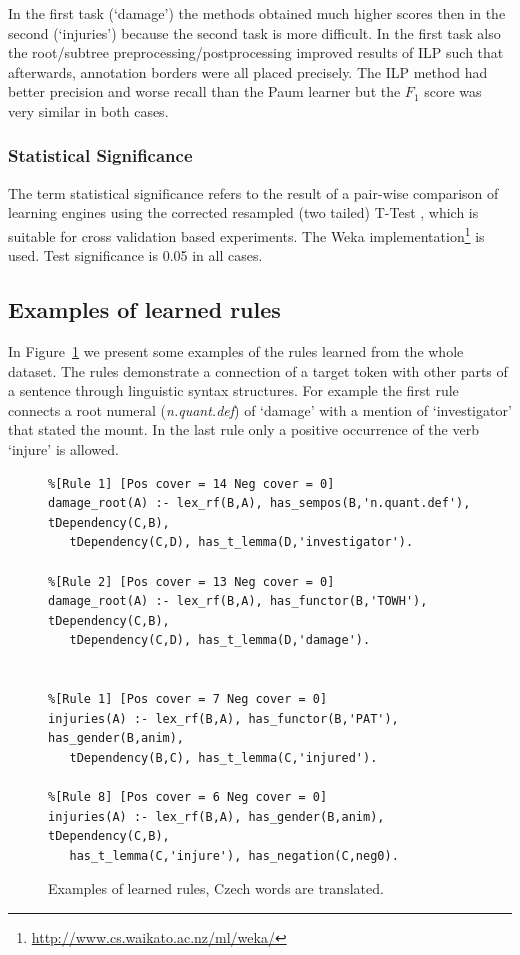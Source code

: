 In the first task (`damage') the methods obtained much higher scores then in the second (`injuries') because the second task is more difficult. In the first task also the root/subtree preprocessing/postprocessing improved results of ILP such that afterwards, annotation borders were all placed precisely. The ILP method had better precision and worse recall than the Paum learner but the $F_1$ score was very similar in both cases.

\subsubsection{Statistical Significance}
The term statistical significance refers to the result of a pair-wise comparison of learning engines using the corrected resampled (two tailed) T-Test \citep{Nadeau:2003:IGE:779909.779927}, which is suitable for cross validation based experiments. The Weka implementation\footnote{\url{http://www.cs.waikato.ac.nz/ml/weka/}} is used. Test significance is 0.05 in all cases.

\subsection{Examples of learned rules}

In Figure~\ref{fig:rules} we present some examples of the rules learned from the whole dataset. The rules demonstrate a connection of a target token with other parts of a sentence through linguistic syntax structures. For example the first rule connects a root numeral (\emph{n.quant.def}) of `damage' with a mention of `investigator' that stated the mount. In the last rule only a positive occurrence of the verb `injure' is allowed.

\begin{figure}
\begin{verbatim}
%[Rule 1] [Pos cover = 14 Neg cover = 0]
damage_root(A) :- lex_rf(B,A), has_sempos(B,'n.quant.def'), tDependency(C,B),
   tDependency(C,D), has_t_lemma(D,'investigator').

%[Rule 2] [Pos cover = 13 Neg cover = 0]
damage_root(A) :- lex_rf(B,A), has_functor(B,'TOWH'), tDependency(C,B),
   tDependency(C,D), has_t_lemma(D,'damage').


%[Rule 1] [Pos cover = 7 Neg cover = 0]
injuries(A) :- lex_rf(B,A), has_functor(B,'PAT'), has_gender(B,anim),
   tDependency(B,C), has_t_lemma(C,'injured').

%[Rule 8] [Pos cover = 6 Neg cover = 0]
injuries(A) :- lex_rf(B,A), has_gender(B,anim), tDependency(C,B),
   has_t_lemma(C,'injure'), has_negation(C,neg0).
\end{verbatim}
	\caption{Examples of learned rules, Czech words are translated.}
	\label{fig:rules}
\end{figure}





